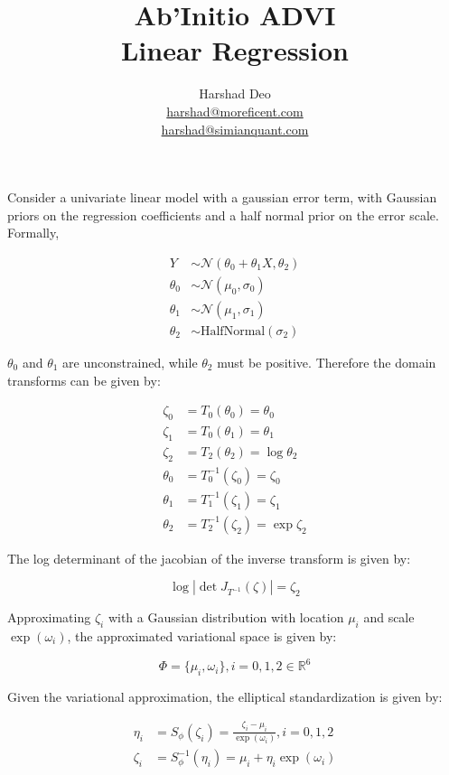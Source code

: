 \documentclass[10pt]{article}
\title{Ab'Initio ADVI \\ Linear Regression}
\author{Harshad Deo \\ 
  \href{mailto:harshad@moreficent.com}{harshad@moreficent.com} \\ 
  \href{mailto:harshad@simianquant.com}{harshad@simianquant.com}
}
\date{}
\begin{document}
  
\maketitle

Consider a univariate linear model with a gaussian error term, with Gaussian priors on the regression coefficients and 
a half normal prior on the error scale. Formally,

\begin{align*}
  Y &\sim \mathcal{N}(\theta_0 + \theta_1 X, \theta_2) \\
  \theta_0 &\sim \mathcal{N}(\mu_0, \sigma_0) \\
  \theta_1 &\sim \mathcal{N}(\mu_1, \sigma_1) \\
  \theta_2 &\sim \text{HalfNormal}(\sigma_2)
\end{align*}

$\theta_0$ and $\theta_1$ are unconstrained, while $\theta_2$ must be positive. Therefore the domain transforms 
can be given by:

\begin{align*}
  \zeta_0 &= T_0(\theta_0) = \theta_0 \\
  \zeta_1 &= T_0(\theta_1) = \theta_1 \\
  \zeta_2 &= T_2(\theta_2) = \log \theta_2 \\
  \theta_0 &= T^{-1}_0(\zeta_0) = \zeta_0 \\
  \theta_1 &= T^{-1}_1(\zeta_1) = \zeta_1 \\
  \theta_2 &= T^{-1}_2(\zeta_2) = \exp \zeta_2
\end{align*}

The log determinant of the jacobian of the inverse transform is given by:

\begin{equation*}
  \log|\det J_{T^{-1}}(\zeta)| = \zeta_2
\end{equation*}

Approximating $\zeta_i$ with a Gaussian distribution with location $\mu_i$ and scale $\exp(\omega_i)$, the approximated 
variational space is given by:

\begin{equation*}
  \Phi = \{\mu_i, \omega_i\}, i = 0, 1, 2 \in \mathbb{R}^6
\end{equation*}


Given the variational approximation, the elliptical standardization is given by:

\begin{align*}
  \eta_i &= S_{\phi}(\zeta_i) = \frac{\zeta_i - \mu_i}{\exp(\omega_i)}, i = 0, 1, 2 \\
  \zeta_i &= S_{\phi}^{-1}(\eta_i) = \mu_i + \eta_i \exp(\omega_i)
\end{align*}
\end{document}
